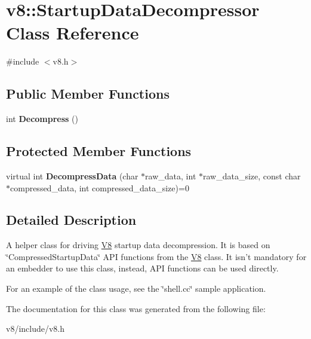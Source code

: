 \hypertarget{classv8_1_1StartupDataDecompressor}{\section{v8\-:\-:Startup\-Data\-Decompressor Class Reference}
\label{classv8_1_1StartupDataDecompressor}
}


{\ttfamily \#include $<$v8.\-h$>$}

\subsection*{Public Member Functions}
\begin{DoxyCompactItemize}
\item 
\hypertarget{classv8_1_1StartupDataDecompressor_aa970485a491f415500bfb0632e472ab7}{int {\bfseries Decompress} ()}\label{classv8_1_1StartupDataDecompressor_aa970485a491f415500bfb0632e472ab7}

\end{DoxyCompactItemize}
\subsection*{Protected Member Functions}
\begin{DoxyCompactItemize}
\item 
\hypertarget{classv8_1_1StartupDataDecompressor_a503b3e37337dfc60729e773ca60827b9}{virtual int {\bfseries Decompress\-Data} (char $\ast$raw\-\_\-data, int $\ast$raw\-\_\-data\-\_\-size, const char $\ast$compressed\-\_\-data, int compressed\-\_\-data\-\_\-size)=0}\label{classv8_1_1StartupDataDecompressor_a503b3e37337dfc60729e773ca60827b9}

\end{DoxyCompactItemize}


\subsection{Detailed Description}
A helper class for driving \hyperlink{classv8_1_1V8}{V8} startup data decompression. It is based on \char`\"{}\-Compressed\-Startup\-Data\char`\"{} A\-P\-I functions from the \hyperlink{classv8_1_1V8}{V8} class. It isn't mandatory for an embedder to use this class, instead, A\-P\-I functions can be used directly.

For an example of the class usage, see the \char`\"{}shell.\-cc\char`\"{} sample application. 

The documentation for this class was generated from the following file\-:\begin{DoxyCompactItemize}
\item 
v8/include/v8.\-h\end{DoxyCompactItemize}
